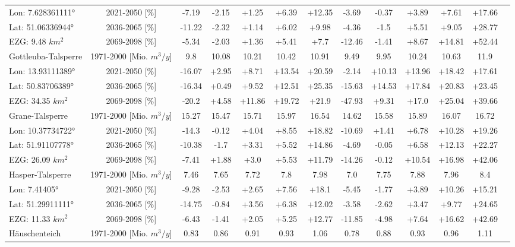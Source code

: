 \begin{longtable}{@{\extracolsep{\fill}}lc|ccccc||cccccc}
\cline{2-12} 
Lon: 7.628361111° & 2021-2050 [\%]  & -7.19 & -2.15 & +1.25 & +6.39 & +12.35 & -3.69 & -0.37 & +3.89 & +7.61 & +17.66\\ 
Lat: 51.06336944° & 2036-2065 [\%]  & -11.22 & -2.32 & +1.14 & +6.02 & +9.98 & -4.36 & -1.5 & +5.51 & +9.05 & +28.77\\ 
EZG: 9.48 $km^2$ & 2069-2098 [\%]  & -5.34 & -2.03 & +1.36 & +5.41 & +7.7 & -12.46 & -1.41 & +8.67 & +14.81 & +52.44\\ 
\hline 
Gottleuba-Talsperre & 1971-2000 [Mio. $m^3/y$]  & 9.8 & 10.08 & 10.21 & 10.42 & 10.91 & 9.49 & 9.95 & 10.24 & 10.63 & 11.9\\ 
\cline{2-12} 
Lon: 13.93111389° & 2021-2050 [\%]  & -16.07 & +2.95 & +8.71 & +13.54 & +20.59 & -2.14 & +10.13 & +13.96 & +18.42 & +17.61\\ 
Lat: 50.83706389° & 2036-2065 [\%]  & -16.34 & +0.49 & +9.52 & +12.51 & +25.35 & -15.63 & +14.53 & +17.84 & +20.83 & +23.45\\ 
EZG: 34.35 $km^2$ & 2069-2098 [\%]  & -20.2 & +4.58 & +11.86 & +19.72 & +21.9 & -47.93 & +9.31 & +17.0 & +25.04 & +39.66\\ 
\hline 
Grane-Talsperre & 1971-2000 [Mio. $m^3/y$]  & 15.27 & 15.47 & 15.71 & 15.97 & 16.54 & 14.62 & 15.58 & 15.89 & 16.07 & 16.72\\ 
\cline{2-12} 
Lon: 10.37734722° & 2021-2050 [\%]  & -14.3 & -0.12 & +4.04 & +8.55 & +18.82 & -10.69 & +1.41 & +6.78 & +10.28 & +19.26\\ 
Lat: 51.91107778° & 2036-2065 [\%]  & -10.38 & -1.7 & +3.31 & +5.52 & +14.86 & -4.69 & -0.05 & +6.58 & +12.13 & +22.27\\ 
EZG: 26.09 $km^2$ & 2069-2098 [\%]  & -7.41 & +1.88 & +3.0 & +5.53 & +11.79 & -14.26 & -0.12 & +10.54 & +16.98 & +42.06\\ 
\hline 
Hasper-Talsperre & 1971-2000 [Mio. $m^3/y$]  & 7.46 & 7.65 & 7.72 & 7.8 & 7.98 & 7.0 & 7.75 & 7.88 & 7.96 & 8.4\\ 
\cline{2-12} 
Lon: 7.41405° & 2021-2050 [\%]  & -9.28 & -2.53 & +2.65 & +7.56 & +18.1 & -5.45 & -1.77 & +3.89 & +10.26 & +15.21\\ 
Lat: 51.29911111° & 2036-2065 [\%]  & -14.75 & -0.84 & +3.56 & +6.38 & +12.02 & -3.58 & -2.62 & +3.47 & +9.77 & +24.65\\ 
EZG: 11.33 $km^2$ & 2069-2098 [\%]  & -6.43 & -1.41 & +2.05 & +5.25 & +12.77 & -11.85 & -4.98 & +7.64 & +16.62 & +42.69\\ 
\hline 
Häuschenteich & 1971-2000 [Mio. $m^3/y$]  & 0.83 & 0.86 & 0.91 & 0.93 & 1.06 & 0.78 & 0.88 & 0.93 & 0.96 & 1.11\\ 

\end{longtable}
